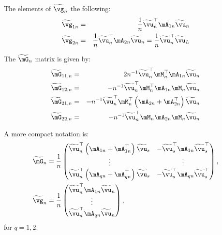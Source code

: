 \documentclass[english,12pt]{book}\usepackage[]{graphicx}\usepackage[]{xcolor}
\begin{document}
The elements of $\widetilde{\vg}_n$ the following:
\begin{eqnarray*}
	\widetilde{\vg}_{1n}  &=& \frac{1}{n}\widetilde{\vu}^\top_n\mA_{1n}\widetilde{\vu}_n \\
\widetilde{\vg}_{2n}  &=&  \frac{1}{n}\widetilde{\vu}^\top_n\mA_{2n}\widetilde{\vu}_n   =  \frac{1}{n} \widetilde{\vu}^\top_n\widetilde{\vu}_L
\end{eqnarray*}

The $\widetilde{\mG}_n$ matrix is given by:
\begin{eqnarray*}
\widetilde{\mG}_{11,n} &=& 2n^{-1}\widetilde{\vu}^\top_n\mM^\top_n\mA_{1n}\widetilde{\vu}_n \\
\widetilde{\mG}_{12,n} &=& -n^{-1}\widetilde{\vu}^\top_n\mM^\top_n\mA_{1n}\mM_n\widetilde{\vu}_n \\
\widetilde{\mG}_{21,n} &=& -n^{-1}\widetilde{\vu}^\top_n\mM^\top_n\left(\mA_{2n} + \mA_{2n}^\top\right)\widetilde{\vu}_n \\
\widetilde{\mG}_{22,n}&=& -n^{-1}\widetilde{\vu}^\top_n\mM_n\mA_{2n}\mM_n\widetilde{\vu}_n
\end{eqnarray*}

A more compact notation is:
\begin{equation}\label{eq:G-g-moments}
\begin{aligned}
\widetilde{\mG}_n & = \frac{1}{n}
                    \begin{pmatrix}
                      \widetilde{\vu}^\top_n\left(\mA_{1n} + \mA^\top_{1n}\right)\widetilde{\vu}_s & - \widetilde{\vu}^\top_s\mA_{1n}\widetilde{\vu}^\top_s \\
                      \vdots & \vdots \\
                      \widetilde{\vu}^\top_n\left(\mA_{qn} + \mA^\top_{qn}\right)\widetilde{\vu}_s & - \widetilde{\vu}^\top_s\mA_{qn}\widetilde{\vu}^\top_s
                    \end{pmatrix}, \\
\widetilde{\vg}_n & = \frac{1}{n}\begin{pmatrix}
                                \widetilde{\vu}^\top_n\mA_{1n}\widetilde{\vu}_n \\
                                \vdots \\
                                \widetilde{\vu}^\top_n\mA_{qn}\widetilde{\vu}_n
                                \end{pmatrix},
\end{aligned}
\end{equation}
%
for $q = 1, 2$.
\end{document}
